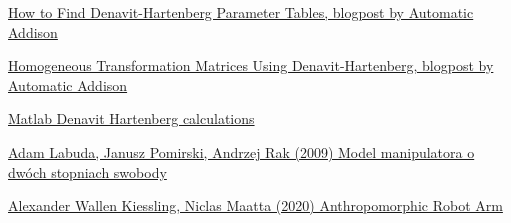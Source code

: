 \documentclass[a4paper,13pt]{article}
\begin{document}
\begin{thebibliography}{9}
\href{https://automaticaddison.com/how-to-find-denavit-hartenberg-parameter-tables/}{How to Find Denavit-Hartenberg Parameter Tables, blogpost by Automatic Addison}

\href{https://automaticaddison.com/homogeneous-transformation-matrices-using-denavit-hartenberg/}{Homogeneous Transformation Matrices Using Denavit-Hartenberg, blogpost by Automatic Addison}

\href{./DH_calculations.m}{Matlab Denavit Hartenberg calculations}

\href{https://sj.umg.edu.pl/sites/default/files/ZN20.pdf}{Adam Labuda, Janusz Pomirski, Andrzej Rak (2009) Model manipulatora o dwóch stopniach swobody}


\bibitem{}
\href{https://www.diva-portal.org/smash/get/diva2:1462059/FULLTEXT01.pdf}{Alexander Wallen Kiessling, Niclas Maatta (2020) Anthropomorphic Robot Arm}

\end{thebibliography}
\end{document}
